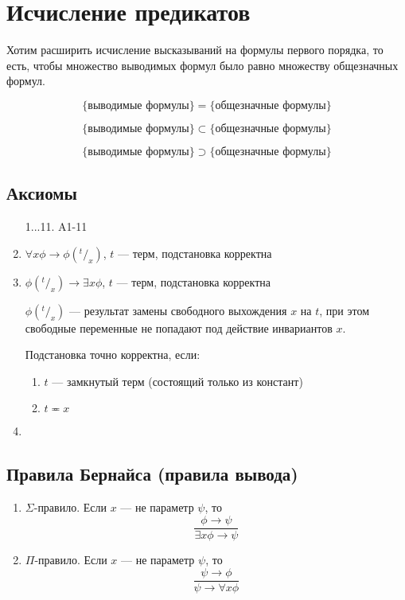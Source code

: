 
\section{Исчисление предикатов}
Хотим расширить исчисление высказываний на формулы первого порядка, то есть, чтобы множество выводимых формул было равно множеству общезначных формул.

$$\{\text{выводимые формулы}\} = \{\text{общезначные формулы}\}$$
\begin{theorem}
    $$\{\text{выводимые формулы}\} \subset \{\text{общезначные формулы}\}$$
\end{theorem}
\begin{theorem}
    $$\{\text{выводимые формулы}\} \supset \{\text{общезначные формулы}\}$$
\end{theorem}

\subsection{Аксиомы}
\begin{enumerate}
    \item[1...11.] A1-11
    \setcounter{enumi}{11}
    \item $\forall x \phi \rightarrow \phi(^t/_x)$, $t$ --- терм, подстановка корректна
    \item $\phi(^t/_x) \rightarrow \exists x \phi$, $t$ --- терм, подстановка корректна

    $\phi(^t/_x)$ --- результат замены свободного выхождения $x$ на $t$, при этом свободные переменные не попадают под действие инвариантов $x$.

    Подстановка точно корректна, если:
    \begin{enumerate}
        \item $t$ --- замкнутый терм (состоящий только из констант)
        \item $t \eqcirc x$
    \end{enumerate}

    \item
\end{enumerate}

\subsection{Правила Бернайса (правила вывода)}
\begin{enumerate}
    \item $\Sigma$-правило. Если $x$ --- не параметр $\psi$, то
    $$\frac{\phi \rightarrow \psi}{\exists x \phi \rightarrow \psi}$$
    \item $\Pi$-правило. Если $x$ --- не параметр $\psi$, то
    $$\frac{\psi \rightarrow \phi}{\psi \rightarrow \forall x \phi}$$
\end{enumerate}

